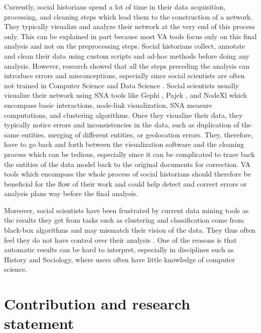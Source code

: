 Currently, social historians spend a lot of time in their data acquisition, processing, and cleaning steps which lead them to the construction of a network.
They typically visualize and analyze their network at the very end of this process only.
This can be explained in part because most VA tools focus only on this final analysis and not on the preprocessing steps.
Social historians collect, annotate and clean their data using custom scripts and ad-hoc methods before doing any analysis.
However, research showed that all the steps preceding the analysis can introduce errors and misconceptions, especially since social scientists are often not trained in Computer Science and Data Science \cite{lemercier12FormalNetwork2015a, lkadi2022}.
Social scientists usually visualize their network using SNA tools like Gephi \cite{Gephi}, Pajek \cite{pajek}, and NodeXl \cite{noauthor_nodexl_nodate} which encompass basic interactions, node-link visualization, SNA measure computations, and clustering algorithms.
Once they visualize their data, they typically notice errors and inconsistencies in the data, such as duplication of the same entities, merging of different entities, or geolocation errors.
They, therefore, have to go back and forth between the visualization software and the cleaning process which can be tedious, especially since it can be complicated to trace back the entities of the data model back to the original documents for correction.
VA tools which encompass the whole process of social historians should therefore be beneficial for the flow of their work and could help detect and correct errors or analysis plans way before the final analysis.

Moreover, social scientists have been frustrated by current data mining tools as the results they get from tasks such as clustering and classification come from black-box algorithms and may mismatch their vision of the data.
They thus often feel they do not have control over their analysis \cite{lepetitHistoireQuantitativeDeux1989}.
One of the reasons is that automatic results can be hard to interpret, especially in disciplines such as History and Sociology, where users often have little knowledge of computer science.



\section{Contribution and research statement}\label{sec:contribution-and-research-statement}


